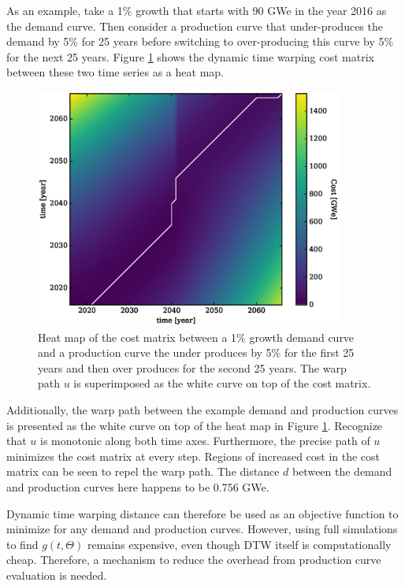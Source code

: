 As an example, take a 1\% growth that starts with 90 GWe in the year
2016 as the demand curve. Then consider a production curve that
under-produces the demand by 5\% for 25 years before switching to
over-producing this curve by 5\% for the next 25 years.
Figure \ref{cost-demand-to-production} shows the dynamic time warping
cost matrix between these two time series as a heat map.

\begin{figure}[htb]
\centering
\includegraphics[width=0.9\textwidth]{cost-demand-to-production.eps}
\caption{Heat map of the cost matrix between a 1\% growth demand curve and
a production curve the under produces by 5\% for the first 25 years and then
over produces for the second 25 years.
The warp path $u$ is superimposed as the white curve on top of the
cost matrix.}
\label{cost-demand-to-production}
\end{figure}

Additionally, the warp path between the example demand and production
curves is presented as the white curve on top of the heat map in
Figure \ref{cost-demand-to-production}.
Recognize that $u$ is monotonic along both time axes. Furthermore, the precise
path of $u$ minimizes the cost matrix at every step. Regions of increased
cost in the cost matrix can be seen to repel the warp path. The
distance $d$ between the demand and production curves here happens
to be 0.756 GWe.

Dynamic time warping distance can therefore be used as an objective function
to minimize for any demand and production curves. However, using full
simulations to find $g(t, \Theta)$ remains expensive, even though DTW itself
is computationally cheap. Therefore, a mechanism to reduce the overhead
from production curve evaluation is needed.
